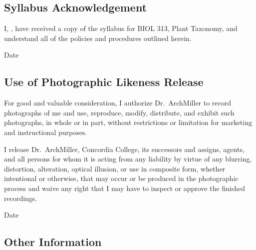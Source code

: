 \documentclass{tufte-handout}
\begin{document}
\newpage

\subsection{Syllabus Acknowledgement}

I, \underline{\hspace{5cm}}, have received a copy of the syllabus for BIOL 313, Plant Taxonomy, and understand all of the policies and procedures outlined herein. 

  \underline{\hspace{5cm}} {Date}  \hrulefill


\subsection{Use of Photographic Likeness Release}

For good and valuable consideration, I authorize Dr.~ArchMiller to record photographs of me and use, reproduce, modify, distribute, and exhibit such photographs, in whole or in part, without restrictions or limitation for marketing and instructional purposes. 

I release Dr.~ArchMiller, Concordia College, its successors and assigns, agents, and all persons for whom it is acting from any liability by virtue of any blurring, distortion, alteration, optical illusion, or use in composite form, whether intentional or otherwise, that may occur or be produced in the photographic process and waive any right that I may have to inspect or approve the finished recordings.

  \hrulefill
{}  \underline{\hspace{5cm}} {Date}  \hrulefill

\subsection{Other Information}

 \hrulefill

 \hrulefill

 \hrulefill

 \hrulefill


 \hrulefill

\hrulefill

\hrulefill

\hrulefill

\hrulefill

\hrulefill
\end{document}
